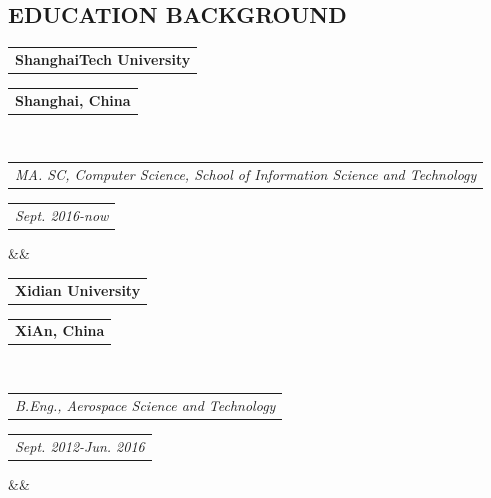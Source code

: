 \documentclass[11pt,a4paper,palatine]{moderncv}        %
\makeatletter
\newcommand*{\customcventry}[7][.25em]{
  \begin{tabular}{@{}l} 
    {\bfseries #4}
  \end{tabular}
  \hfill%
  \begin{tabular}{l@{}}
     {\bfseries #5}
  \end{tabular} \\
  \begin{tabular}{@{}l} 
    {\itshape #3}
  \end{tabular}
  \hfill%
  \begin{tabular}{l@{}}
     {\itshape #2}
  \end{tabular}
  \ifx&#7&%
  \else{\\%
    \begin{minipage}{\maincolumnwidth}%
      \small#7%
    \end{minipage}}\fi%
  \par\addvspace{#1}}
\makeatother
\begin{document}
\begin{CJK*}{UTF8}{gbsn}                          %
\makecvtitle
\vspace*{-15mm}


\section{EDUCATION BACKGROUND}
{\customcventry{Sept. 2016-now}{MA. SC, Computer Science, School of Information Science and Technology}{ShanghaiTech University}{Shanghai, China}{}{}}
 
{\customcventry{ Sept. 2012-Jun. 2016}{B.Eng., Aerospace Science and Technology}{Xidian University}{XiAn, China}{}{}}





\end{CJK*}
\end{document}
